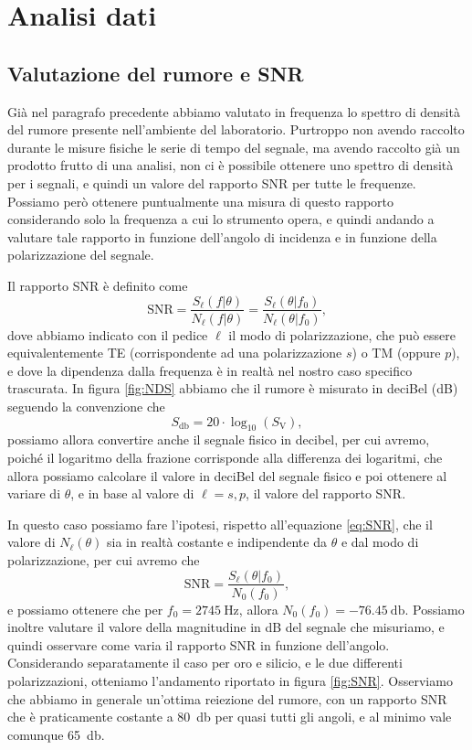 \documentclass[
    prb,altaffilletter,citeautoscript,
    amsmath,amssymb,
    showpacs,showkeys,floatfix,
    reprint
]{revtex4-1}
\begin{document}
\section{Analisi dati}

\subsection{Valutazione del rumore e SNR}

Già  nel paragrafo precedente abbiamo valutato in frequenza lo spettro di densità del rumore presente nell'ambiente del laboratorio. Purtroppo non avendo raccolto durante le misure fisiche le serie di tempo del segnale, ma avendo raccolto già un prodotto frutto di una analisi, non ci è possibile ottenere uno spettro di densità per i segnali, e quindi un valore del rapporto SNR per tutte le frequenze. Possiamo però ottenere puntualmente una misura di questo rapporto considerando solo la frequenza a cui lo strumento opera, e quindi andando a valutare tale rapporto in funzione dell'angolo di incidenza e in funzione della polarizzazione del segnale. 

Il rapporto SNR è definito come \begin{equation}
    \text{SNR} = \frac{S_\ell(f|\theta)}{N_\ell (f|\theta)} = \frac{S_\ell(\theta | f_0)}{N_\ell (\theta | f_0)},\label{eq:SNR}
\end{equation} dove abbiamo indicato con il pedice $\ell$ il modo di polarizzazione, che può essere equivalentemente TE (corrispondente ad una polarizzazione $s$) o TM (oppure $p$), e dove la dipendenza dalla frequenza è in realtà nel nostro caso specifico trascurata. In figura \ref{fig:NDS} abbiamo che il rumore è misurato in deciBel (dB) seguendo la convenzione che \begin{equation}
    S_{\si{\decibel}} = 20 \cdot \log_{10}(S_{\si{\volt}}),
\end{equation} possiamo allora convertire anche il segnale fisico in decibel, per cui avremo, poiché il logaritmo della frazione corrisponde alla differenza dei logaritmi, che allora possiamo calcolare il valore in deciBel del segnale fisico e poi ottenere al variare di $\theta$, e in base al valore di $\ell=s,p$, il valore del rapporto SNR. 

In questo caso possiamo fare l'ipotesi, rispetto all'equazione \eqref{eq:SNR}, che il valore di $N_\ell (\theta)$ sia in realtà costante e indipendente da $\theta$ e dal modo di polarizzazione, per cui avremo che \begin{equation}
    \text{SNR} = \frac{S_\ell(\theta | f_0)}{N_0(f_0)},
\end{equation} e possiamo ottenere che per $f_0=\SI{2745}{\hertz}$, allora $N_0(f_0) = \SI{-76.45}{\decibel}$. Possiamo inoltre valutare il valore della magnitudine in dB del segnale che misuriamo, e quindi osservare come varia il rapporto SNR in funzione dell'angolo. Considerando separatamente il caso per oro e silicio, e le due differenti polarizzazioni, otteniamo l'andamento riportato in figura \ref{fig:SNR}. Osserviamo che abbiamo in generale un'ottima reiezione del rumore, con un rapporto SNR che è praticamente costante a \SI{80}{\decibel} per quasi tutti gli angoli, e al minimo vale comunque \SI{65}{\decibel}.
\end{document}
